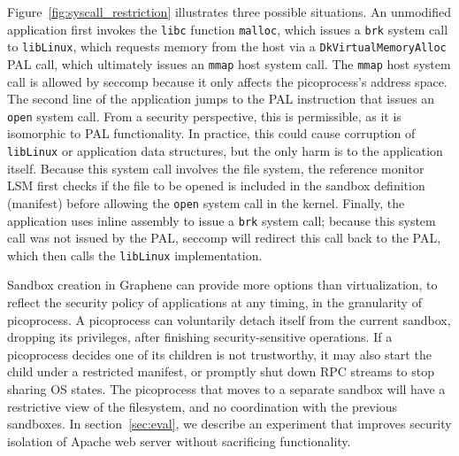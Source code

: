 \vspace{5pt}
Figure~\ref{fig:syscall_restriction} illustrates three possible situations. 
An unmodified application first invokes the {\tt libc} function {\tt malloc}, which issues 
a {\tt brk} system call to {\tt libLinux}, which requests memory 
from the host via a {\tt Dk\-Virtual\-Memory\-Alloc} PAL call,
which ultimately issues an {\tt mmap} host system call.
The {\tt mmap} host system call is allowed by seccomp because it only 
affects the picoprocess's address space.
The second line of the application jumps to the PAL instruction that issues
an {\tt open} system call.
From a security perspective, this is permissible,
as it is isomorphic to PAL functionality.
In practice, this could cause
corruption of {\tt libLinux} or application data structures,
but the only harm is to the application itself. 
Because this system call involves the file system, the reference monitor LSM first checks if the file to be opened is included in the sandbox definition (manifest) before allowing  the {\tt open} system call in the kernel.  
Finally, the application uses inline assembly to issue a {\tt brk} system call;
because this system call was not issued by the PAL,
seccomp will redirect this call back to the PAL,
which then calls the {\tt libLinux} implementation.

\vspace{5pt}
Sandbox creation in Graphene can provide
more options than virtualization, to reflect the security policy of applications at any timing,
in the granularity of picoprocess. 
A picoprocess can voluntarily detach itself from the current sandbox, dropping its privileges,
after finishing security-sensitive operations.
If a picoprocess decides one of its children is not trustworthy, it may also start the child under a restricted manifest,
or promptly shut down RPC streams to stop sharing OS states.
The picoprocess that moves to a separate sandbox will have a restrictive view of the filesystem, and no coordination with the previous sandboxes.
In section~\ref{sec:eval}, we describe an experiment that improves security isolation of Apache web server without sacrificing functionality.

